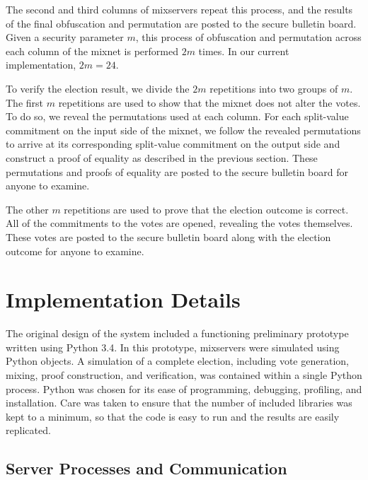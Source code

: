 The second and third columns of mixservers repeat this process, and the results of the final obfuscation and permutation are posted to the secure bulletin board. Given a security parameter $m$, this process of obfuscation and permutation across each column of the mixnet is performed $2m$ times. In our current implementation, $2m = 24$.

To verify the election result, we divide the $2m$ repetitions into two groups of $m$. The first $m$ repetitions are used to show that the mixnet does not alter the votes. To do so, we reveal the permutations used at each column. For each split-value commitment on the input side of the mixnet, we follow the revealed permutations to arrive at its corresponding split-value commitment on the output side and construct a proof of equality as described in the previous section. These permutations and proofs of equality are posted to the secure bulletin board for anyone to examine.

The other $m$ repetitions are used to prove that the election outcome is correct. All of the commitments to the votes are opened, revealing the votes themselves. These votes are posted to the secure bulletin board along with the election outcome for anyone to examine.

\section{Implementation Details} \label{sv:implementation}

The original design of the system included a functioning preliminary prototype written using Python 3.4. In this prototype, mixservers were simulated using Python objects. A simulation of a complete election, including vote generation, mixing, proof construction, and verification, was contained within a single Python process. Python was chosen for its ease of programming, debugging, profiling, and installation. Care was taken to ensure that the number of included libraries was kept to a minimum, so that the code is easy to run and the results are easily replicated.

\subsection{Server Processes and Communication} \label{sv:implementation:comm}

